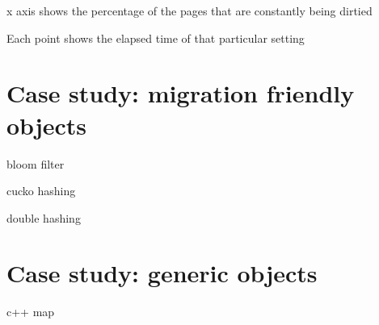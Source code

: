 x axis shows the percentage of the pages that are constantly being dirtied

Each point shows the elapsed time of that particular setting


\section{Case study: migration friendly objects}

bloom filter

cucko hashing

double hashing

\section{Case study: generic objects}

c++ map



